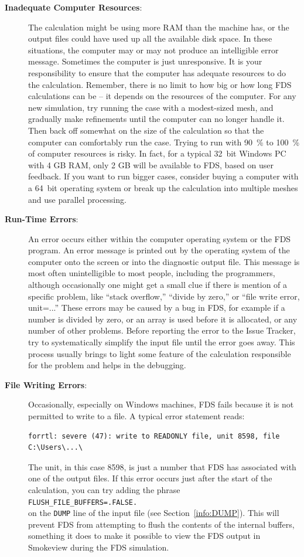 \documentclass[11pt]{book}
\newcommand{\ct}{\tt\small}
\begin{document}
\begin{description}
\item[{\bf Inadequate Computer Resources}:]
The calculation might be using more RAM than the machine
has, or the output files could have used up all the available disk space. In these situations, the
computer may or may not produce an intelligible error message. Sometimes the computer is just
unresponsive. It is your responsibility to ensure that the computer has adequate resources to
do the calculation. Remember, there is no limit to how big or how long FDS calculations can be -- it
depends on the resources of the computer. For any new simulation, try running the case with a modest-sized mesh,
and gradually make refinements until the computer can no longer handle it. Then back off
somewhat on the size of the calculation so that the computer can comfortably run the
case. Trying to run with 90~\% to 100~\% of computer resources is risky.
In fact, for a typical 32~bit Windows PC with 4 GB RAM, only 2 GB will be available to FDS, based on user feedback.
If you want to run bigger cases, consider buying a computer with a 64~bit operating system or break up the
calculation into multiple meshes and use parallel processing.

\item[{\bf Run-Time Errors}:]
An error occurs either within the computer operating system or the
FDS program. An error message is printed out by the operating system of
the computer onto the screen or into the diagnostic output file. This
message is most often unintelligible to most people, including the programmers,
although occasionally one might get a small clue if there is mention of a specific problem,
like ``stack overflow,'' ``divide by zero,'' or ``file write error, unit=...''
These errors may be caused by a bug in FDS, for example if a number is divided by zero,
or an array is used before it is allocated, or any number of other problems.
Before reporting the error to the Issue Tracker, try to systematically simplify the
input file until the error goes away. This process usually brings to light some feature of the
calculation responsible for the problem and helps in the debugging.

\item[{\bf File Writing Errors}:]
Occasionally, especially on Windows machines, FDS fails because it is not permitted to write to a file. A typical error statement reads:
\footnotesize
\begin{verbatim}
forrtl: severe (47): write to READONLY file, unit 8598, file C:\Users\...\
\end{verbatim} \normalsize
The unit, in this case 8598, is just a number that FDS has associated with one of the output files. If this error occurs just after the start of
the calculation, you can try adding the phrase \\ {\ct FLUSH\_FILE\_BUFFERS=.FALSE.} \\ on the {\ct DUMP} line of the input file (see Section~\ref{info:DUMP}).
This will prevent FDS from attempting to flush the contents of the internal buffers, something it does to make it possible to view the FDS output
in Smokeview during the FDS simulation.


\end{description}
\end{document}
